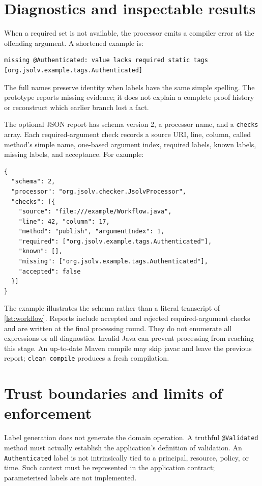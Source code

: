 \documentclass[11pt]{article}
\begin{document}
\section{Diagnostics and inspectable results}

When a required set is not available, the processor emits a compiler error at
the offending argument. A shortened example is:
\begin{lstlisting}
missing @Authenticated: value lacks required static tags
[org.jsolv.example.tags.Authenticated]
\end{lstlisting}
The full names preserve identity when labels have the same simple spelling.
The prototype reports missing evidence; it does not explain a complete proof
history or reconstruct which earlier branch lost a fact.

The optional JSON report has schema version 2, a processor name, and a
\texttt{checks} array. Each required-argument check records a source URI, line,
column, called method's simple name, one-based argument index, required labels,
known labels, missing labels, and acceptance. For example:
\begin{lstlisting}
{
  "schema": 2,
  "processor": "org.jsolv.checker.JsolvProcessor",
  "checks": [{
    "source": "file:///example/Workflow.java",
    "line": 42, "column": 17,
    "method": "publish", "argumentIndex": 1,
    "required": ["org.jsolv.example.tags.Authenticated"],
    "known": [],
    "missing": ["org.jsolv.example.tags.Authenticated"],
    "accepted": false
  }]
}
\end{lstlisting}
The example illustrates the schema rather than a literal transcript of
\cref{lst:workflow}. Reports include accepted and rejected required-argument
checks and are written at the final processing round. They do not enumerate
all expressions or all diagnostics. Invalid Java can prevent processing from
reaching this stage. An up-to-date Maven compile may skip javac and leave the
previous report; \texttt{clean compile} produces a fresh compilation.

\section{Trust boundaries and limits of enforcement}
\label{sec:limits}

Label generation does not generate the domain operation. A truthful
\texttt{@Validated} method must actually establish the application's definition
of validation. An \texttt{Authenticated} label is not intrinsically tied to a
principal, resource, policy, or time. Such context must be represented in the
application contract; parameterised labels are not implemented.
\end{document}
